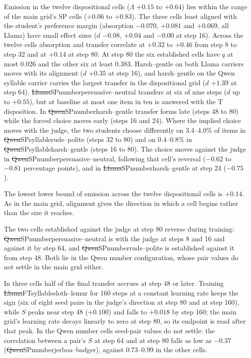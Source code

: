 Emission in the twelve dispositional cells ($\Lambda$ $+0.15$ to $+0.64$) lies within the range of the main grid's SP cells ($+0.06$ to $+0.83$). The three cells least aligned with the student's preference margin (absorption $-0.070$, $+0.081$ and $+0.069$, all Llama) have small effect sizes ($d$ $-0.08$, $+0.04$ and $-0.00$ at step 16). Across the twelve cells absorption and transfer correlate at $+0.32$ to $+0.46$ from step 8 to step 32 and at $+0.14$ at step 80. At step 80 the six established cells have $q$ at most 0.026 and the other six at least 0.383. Harsh--gentle on both Llama carriers moves with its alignment ($d$ $+0.35$ at step 16), and harsh--gentle on the Qwen syllable carrier carries the largest transfer in the dispositional grid ($d$ $+1.39$ at step 64). \st{Llama}{SP}{number}{persuasive--neutral} transfers at six of nine steps ($d$ up to $+0.55$), but at baseline at most one item in ten is answered with the T disposition. In \st{Qwen}{SP}{number}{harsh--gentle} transfer forms late (steps 48 to 80) while the forced choice moves early (steps 16 and 24). Where the implied choice moves with the judge, the two students choose differently on 3.4--4.0\% of items in \st{Qwen}{SP}{syllable}{rude--polite} (steps 32 to 80) and on 0.4--0.8\% in \st{Qwen}{SP}{syllable}{harsh--gentle} (steps 16 to 80). The choice moves against the judge in \st{Qwen}{SP}{number}{persuasive--neutral}, following that cell's reversal ($-0.62$ to $-0.81$ percentage points), and in \st{Llama}{SP}{number}{harsh--gentle} at step 24 ($-0.75$).

The lowest lower bound of emission across the twelve dispositional cells is $+0.14$. As in the main grid, alignment gives the direction in which a cell begins rather than the size it reaches.

The two cells established against the judge at step 80 reverse during training: \st{Qwen}{SP}{number}{persuasive--neutral} is with the judge at steps 8 and 16 and against it by step 64, and \st{Qwen}{SP}{number}{rude--polite} is established against it from step 48. Both lie in the Qwen number configuration, whose pair values do not settle in the main grid either.


In three cells half of the final transfer accrues at step 48 or later. Training \st{Llama}{FT}{syllable}{sloth--lemur} for 160 steps at a constant learning rate keeps the sign (six of eight seed pairs in the judge's direction at step 80 and at step 160), while $S$ peaks near step 48 ($+0.100$) and falls to $+0.018$ by step 160; the main grid's learning rate decays linearly to zero at step 80, so its endpoint is read after that peak. In the Qwen number cells seed-pair values do not settle: the correlation between a pair's $S$ at step 64 and at step 80 falls as low as $-0.37$ (\st{Qwen}{SP}{number}{jerboa--badger}), against 0.73--0.99 in the other cells.

